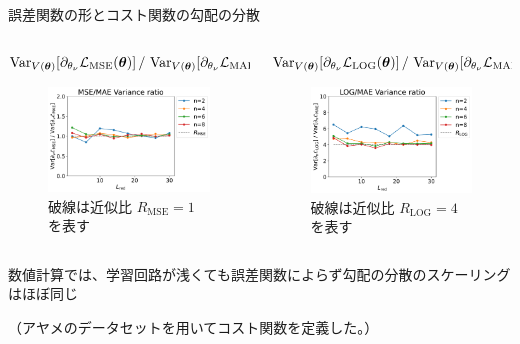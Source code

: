 \documentclass[dvipdfmx,10pt,aspectratio=169]{beamer}
\begin{document}
\begin{frame}{誤差関数の形とコスト関数の勾配の分散}
    \begin{columns}
        \begin{column}{0.5\textwidth}
            \begin{small}
                \centering\hspace*{-10pt} $\operatorname{Var}_{V(\vb*{\theta})}[\partial_{\theta_\nu}\mathcal{L}_{\mathrm{MSE}}(\vb*{\theta})]\,/\,\operatorname{Var}_{V(\vb*{\theta})}[\partial_{\theta_\nu}\mathcal{L}_{\mathrm{MAE}}(\vb*{\theta})]$
            \end{small}
            \begin{figure}
                \centering\includegraphics[width=7cm]{variance-mse-mae-ratio_encoding3.pdf}
                \caption{破線は近似比 $R_{\mathrm{MSE}}=1$ を表す}
            \end{figure}
        \end{column}
        \begin{column}{0.5\textwidth}
            \begin{small}
                \centering\hspace*{-10pt} $\operatorname{Var}_{V(\vb*{\theta})}[\partial_{\theta_\nu}\mathcal{L}_{\mathrm{LOG}}(\vb*{\theta})]\,/\,\operatorname{Var}_{V(\vb*{\theta})}[\partial_{\theta_\nu}\mathcal{L}_{\mathrm{MAE}}(\vb*{\theta})]$
            \end{small}
            \begin{figure}
                \centering\includegraphics[width=7cm]{variance-log-mae-ratio_encoding3.pdf}
                \caption{破線は近似比 $R_{\mathrm{LOG}}=4$ を表す}
            \end{figure}
        \end{column}
    \end{columns}
    \centering
    \hspace{-10pt}数値計算では、学習回路が浅くても誤差関数によらず勾配の分散のスケーリングはほぼ同じ\\
    
    \begin{scriptsize}
        （アヤメのデータセットを用いてコスト関数を定義した。）
    \end{scriptsize}
\end{frame}
\end{document}
